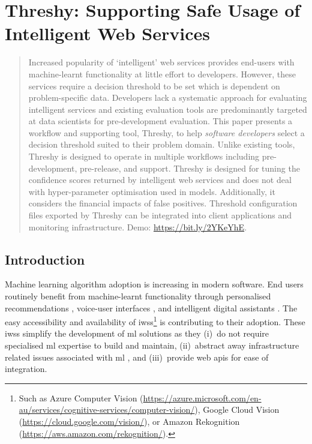 
\chapter[Supporting Safe Usage of Intelligent Web Services]
{Threshy: Supporting Safe Usage of Intelligent Web Services}
\label{ch:fse-demo2020}
\graphicspath{{mainmatter/publications/figures/fse-demo2020/}}

\def\demolink{https://bit.ly/2YKeYhE}
\def\demogooglelink{http://bit.ly/a2i2-threshy}

\glsresetall
\begin{abstract}
Increased popularity of `intelligent' web services provides end-users with machine-learnt functionality at little effort to developers. However, these services require a decision threshold to be set which is dependent on problem-specific data. Developers lack a systematic approach for evaluating intelligent services and existing evaluation tools are predominantly targeted at data scientists for pre-development evaluation. This paper presents a workflow and supporting tool, Threshy, to help \textit{software developers} select a decision threshold suited to their problem domain. Unlike existing tools, Threshy is designed to operate in multiple workflows including pre-development, pre-release, and support. Threshy is designed for tuning the confidence scores returned by intelligent web services and does not deal with hyper-parameter optimisation used in  models. Additionally, it considers the financial impacts of false positives.
Threshold configuration files exported by Threshy can be integrated into client applications and monitoring infrastructure. Demo: \url{\demolink}.
\end{abstract}
\glsresetall

\section{Introduction}

Machine learning algorithm adoption is increasing in modern software. End users routinely benefit from machine-learnt functionality through personalised recommendations \citep{covington2016deep}, voice-user interfaces \citep{myers2018patterns}, and intelligent digital assistants \citep{boyd2018just}. The easy accessibility and availability of \glspl{iws}\footnote{Such as Azure Computer Vision (\url{https://azure.microsoft.com/en-au/services/cognitive-services/computer-vision/}), Google Cloud Vision (\url{https://cloud.google.com/vision/}), or Amazon Rekognition (\url{https://aws.amazon.com/rekognition/}).} is contributing to their adoption. These \glspl{iws} simplify the development of \gls{ml} solutions as they (i)~do not require specialised \gls{ml} expertise to build and maintain, (ii)~abstract away infrastructure related issues associated with \gls{ml} \citep{Sculley2015, Arpteg2018}, and (iii)~provide web \glspl{api} for ease of integration. 


